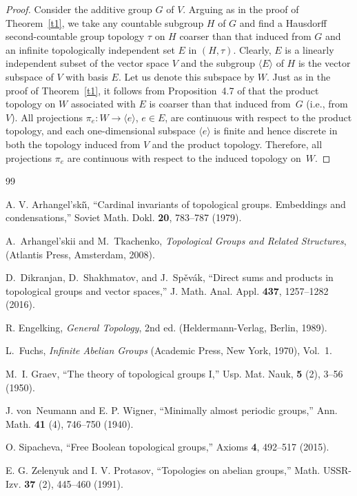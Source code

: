 \documentclass[12pt,a4paper]{amsart}
\theoremstyle{definition}
\begin{document}
\begin{proof}
Consider the additive group $G$ of $V$. Arguing as in the proof of Theorem~\ref{t1}, 
we take any countable subgroup $H$ of $G$ and find a Hausdorff second-countable group topology $\tau$ on $H$ 
coarser than that induced from $G$ and an infinite topologically independent set $E$ in $(H, \tau)$. Clearly, 
$E$ is a linearly independent subset of the vector space $V$ and the subgroup $\langle E\rangle$ of $H$ is 
the vector subspace of $V$ with basis $E$. Let us denote this subspace by $W$. Just as in the proof of 
Theorem~\ref{t1}, it follows from Proposition~4.7 of \cite{DSS} that the product topology on $W$ associated 
with $E$ is coarser than that induced from~$G$ (i.e., from $V$). All projections $\pi_e\colon W\to 
\langle e\rangle$, $e\in E$, are continuous with respect to the product topology, and each one-dimensional 
subspace $\langle e\rangle$ is finite and hence discrete in both the topology induced from $V$ and the product 
topology. Therefore, all projections $\pi_e$ are continuous with respect to the induced topology on~$W$. 
\end{proof}

\begin{thebibliography}{99}

A. V. Arhangel'ski\v\i,
``Cardinal invariants of topological groups. Embeddings and condensations,'' 
Soviet Math. Dokl. \textbf{20}, 783--787 (1979).

A.~Arhangel'skii and M.~Tkachenko,
\emph{Topological Groups and Related Structures},
(Atlantis Press, Amsterdam, 2008).

D.~Dikranjan, D.~Shakhmatov, and J.~Sp\v ev\'ak, 
``Direct sums and products in topological groups and vector spaces,'' 
J. Math. Anal. Appl. \textbf{437}, 1257--1282 (2016).

R. Engelking, \emph{General Topology}, 
2nd ed. (Heldermann-Verlag, Berlin, 1989).

L.~Fuchs,
\emph{Infinite Abelian Groups} 
(Academic Press, New York, 1970), Vol.~1.

M.~I. Graev, 
``The theory of topological groups I,''
Usp. Mat. Nauk,
\textbf{5} (2),
3--56 (1950).

J. von~Neumann and E. P. Wigner,
``Minimally almost periodic groups,'' 
Ann. Math. \textbf{41} (4), 746--750 (1940).

O. Sipacheva, ``Free Boolean topological groups,'' 
Axioms \textbf{4}, 492--517 (2015).

E. G. Zelenyuk and I. V. Protasov, 
``Topologies on abelian groups,'' 
Math. USSR-Izv. \textbf{37} (2), 445--460 (1991).

\end{thebibliography}
\end{document}
